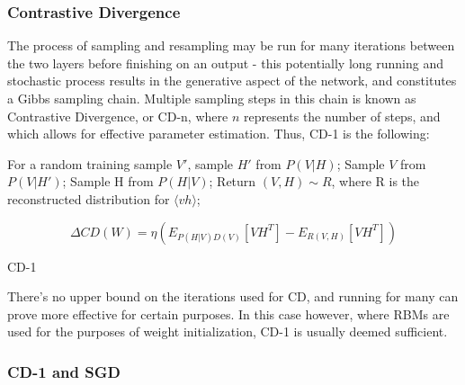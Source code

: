 \documentclass[a4paper,11pt,oneside]{article}
\theoremstyle{plain}
\theoremstyle{definition}
\begin{document}
\subsubsection{Contrastive Divergence}\label{imp_CD}

The process of sampling and resampling may be run for many iterations between the two layers before finishing on an output - this potentially long running and stochastic process results in the generative aspect of the network, and constitutes a Gibbs sampling chain. Multiple sampling steps in this chain is known as Contrastive Divergence, or CD-n, where $n$ represents the number of steps, and which allows for effective parameter estimation. Thus, CD-1 is the following:\newline


\begin{algorithm}[H]
	
	\texttt{}\newline
	
	For a random training sample $V'$, sample $H'$ from $P(V|H)$;\newline
	Sample $V$ from $P(V|H')$;\newline
	Sample H from $P(H|V)$;\newline
	Return $(V,H) \sim R $, where R is the reconstructed distribution for $\langle vh \rangle$;\newline
	
	 
	\begin{equation}
	\Delta CD(W) = \eta( E_{P(H|V)D(V)}[VH^T] - E_{R(V,H)}[VH^T])
	\end{equation}
	
	
	
	\label{algo_cd1}
	\caption{CD-1}
\end{algorithm}

There's no upper bound on the iterations used for CD, and running for many can prove more effective for certain purposes. In this case however, where RBMs are used for the purposes of weight initialization, CD-1 is usually deemed sufficient.

\subsubsection{CD-1 and SGD}
\end{document}

